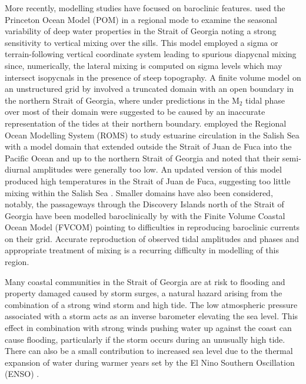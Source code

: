 \documentclass[pdftex,10pt]{article}
\begin{document}
More recently, modelling studies have focused on baroclinic features. \citet{masson2004modelling} used the Princeton Ocean Model (POM) in a regional mode to examine the seasonal variability of deep water properties in the Strait of Georgia noting a strong sensitivity to vertical mixing over the sills. This model employed a sigma or terrain-following vertical coordinate system leading to spurious diapycnal mixing since, numerically, the lateral mixing is computed on sigma levels which may intersect isopycnals in the presence of steep topography. A finite volume model on an unstructured grid by \citet{yang2010multi} involved a truncated domain with an open boundary in the northern Strait of Georgia, where under predictions in the M$_2$ tidal phase over most of their domain were suggested to be caused by an inaccurate representation of the tides at their northern boundary. \citet{sutherland2011model} employed the Regional Ocean Modelling System (ROMS) to study estuarine circulation in the Salish Sea with a model domain that extended outside the Strait of Juan de Fuca into the Pacific Ocean and up to the northern Strait of Georgia and noted that their semi-diurnal amplitudes were generally too low. An updated version of this model produced high temperatures in the Strait of Juan de Fuca, suggesting too little mixing within the Salish Sea \citep{giddings2014hindcasts}. Smaller domains have also been considered, notably, the passageways through the Discovery Islands north of the Strait of Georgia have been modelled baroclinically by \citet{foreman2012circulation} with the Finite Volume Coastal Ocean Model (FVCOM) pointing to difficulties in reproducing baroclinic currents on their grid.  Accurate reproduction of observed tidal amplitudes and phases and appropriate treatment of mixing is a recurring difficulty in modelling of this region.

Many coastal communities in the Strait of Georgia are at risk to flooding and property damaged caused by storm surges, a natural hazard arising from the combination of a strong wind storm and high tide. The low atmospheric pressure associated with a storm acts as an inverse barometer elevating the sea level. This effect in combination with strong winds pushing water up against the coast can cause flooding, particularly if the storm occurs during an unusually high tide.  There can also be a small contribution to increased sea level due to the thermal expansion of water during warmer years set by the El Nino Southern Oscillation (ENSO) \citep{abeys2011extreme}. %
\end{document}
